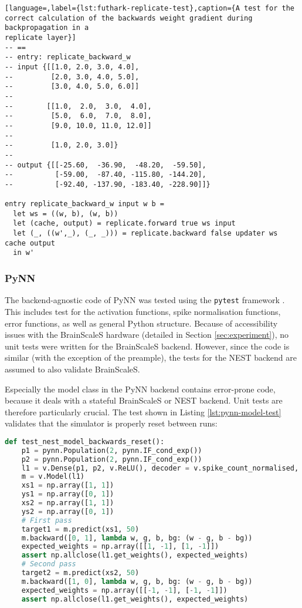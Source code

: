 \begin{minipage}{\linewidth}
\begin{lstlisting}[language=,label={lst:futhark-replicate-test},caption={A test for the
correct calculation of the backwards weight gradient during backpropagation in a
replicate layer}]
-- ==
-- entry: replicate_backward_w
-- input {[[1.0, 2.0, 3.0, 4.0],
--         [2.0, 3.0, 4.0, 5.0],
--         [3.0, 4.0, 5.0, 6.0]]
--
--        [[1.0,  2.0,  3.0,  4.0],
--         [5.0,  6.0,  7.0,  8.0],
--         [9.0, 10.0, 11.0, 12.0]]
--
--         [1.0, 2.0, 3.0]}
--
-- output {[[-25.60,  -36.90,  -48.20,  -59.50],
--          [-59.00,  -87.40, -115.80, -144.20],
--          [-92.40, -137.90, -183.40, -228.90]]}

entry replicate_backward_w input w b =
  let ws = ((w, b), (w, b))
  let (cache, output) = replicate.forward true ws input
  let (_, ((w',_), (_, _))) = replicate.backward false updater ws cache output
  in w'
\end{lstlisting}
\end{minipage}

\subsubsection{PyNN}
The backend-agnostic code of PyNN was tested using the \texttt{pytest} framework
\cite{pytest2018}.
This includes test for the activation functions, spike normalisation functions, error functions, 
as well as general Python structure.
Because of accessibility issues with the BrainScaleS hardware
(detailed in Section \ref{sec:experiment}), no unit tests were written for the
BrainScaleS backend.
However, since the code is similar (with the exception of the preample), the tests for the 
NEST backend are assumed to also validate BrainScaleS.

Especially the model class in the PyNN backend contains error-prone code, because it
deals with a stateful BrainScaleS or NEST backend. Unit tests are therefore particularly crucial.
The test shown in Listing \ref{lst:pynn-model-test} validates that the simulator is
properly reset between runs:

\begin{lstlisting}[language=Python,label={lst:pynn-model-test},caption={Unit test for
PyNN model to validate that the model correctly updates weights}]
def test_nest_model_backwards_reset():
    p1 = pynn.Population(2, pynn.IF_cond_exp())
    p2 = pynn.Population(2, pynn.IF_cond_exp())
    l1 = v.Dense(p1, p2, v.ReLU(), decoder = v.spike_count_normalised, weights = 1)
    m = v.Model(l1)
    xs1 = np.array([1, 1])
    ys1 = np.array([0, 1])
    xs2 = np.array([1, 1])
    ys2 = np.array([0, 1])
    # First pass
    target1 = m.predict(xs1, 50)
    m.backward([0, 1], lambda w, g, b, bg: (w - g, b - bg))
    expected_weights = np.array([[1, -1], [1, -1]])
    assert np.allclose(l1.get_weights(), expected_weights)
    # Second pass
    target2 = m.predict(xs2, 50)
    m.backward([1, 0], lambda w, g, b, bg: (w - g, b - bg))
    expected_weights = np.array([[-1, -1], [-1, -1]])
    assert np.allclose(l1.get_weights(), expected_weights)
\end{lstlisting}

